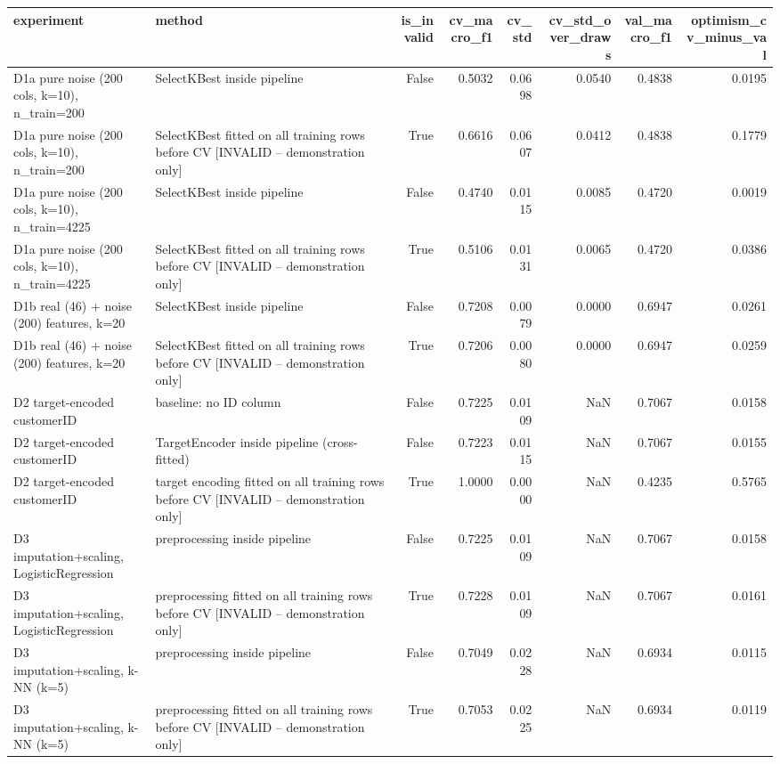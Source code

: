 \begin{tabular}{llrrrrrr}
\toprule
experiment & method & is\_invalid & cv\_macro\_f1 & cv\_std & cv\_std\_over\_draws & val\_macro\_f1 & optimism\_cv\_minus\_val \\
\midrule
D1a pure noise (200 cols, k=10), n\_train=200 & SelectKBest inside pipeline & False & 0.5032 & 0.0698 & 0.0540 & 0.4838 & 0.0195 \\
D1a pure noise (200 cols, k=10), n\_train=200 & SelectKBest fitted on all training rows before CV [INVALID – demonstration only] & True & 0.6616 & 0.0607 & 0.0412 & 0.4838 & 0.1779 \\
D1a pure noise (200 cols, k=10), n\_train=4225 & SelectKBest inside pipeline & False & 0.4740 & 0.0115 & 0.0085 & 0.4720 & 0.0019 \\
D1a pure noise (200 cols, k=10), n\_train=4225 & SelectKBest fitted on all training rows before CV [INVALID – demonstration only] & True & 0.5106 & 0.0131 & 0.0065 & 0.4720 & 0.0386 \\
D1b real (46) + noise (200) features, k=20 & SelectKBest inside pipeline & False & 0.7208 & 0.0079 & 0.0000 & 0.6947 & 0.0261 \\
D1b real (46) + noise (200) features, k=20 & SelectKBest fitted on all training rows before CV [INVALID – demonstration only] & True & 0.7206 & 0.0080 & 0.0000 & 0.6947 & 0.0259 \\
D2 target-encoded customerID & baseline: no ID column & False & 0.7225 & 0.0109 & NaN & 0.7067 & 0.0158 \\
D2 target-encoded customerID & TargetEncoder inside pipeline (cross-fitted) & False & 0.7223 & 0.0115 & NaN & 0.7067 & 0.0155 \\
D2 target-encoded customerID & target encoding fitted on all training rows before CV [INVALID – demonstration only] & True & 1.0000 & 0.0000 & NaN & 0.4235 & 0.5765 \\
D3 imputation+scaling, LogisticRegression & preprocessing inside pipeline & False & 0.7225 & 0.0109 & NaN & 0.7067 & 0.0158 \\
D3 imputation+scaling, LogisticRegression & preprocessing fitted on all training rows before CV [INVALID – demonstration only] & True & 0.7228 & 0.0109 & NaN & 0.7067 & 0.0161 \\
D3 imputation+scaling, k-NN (k=5) & preprocessing inside pipeline & False & 0.7049 & 0.0228 & NaN & 0.6934 & 0.0115 \\
D3 imputation+scaling, k-NN (k=5) & preprocessing fitted on all training rows before CV [INVALID – demonstration only] & True & 0.7053 & 0.0225 & NaN & 0.6934 & 0.0119 \\
\bottomrule
\end{tabular}

